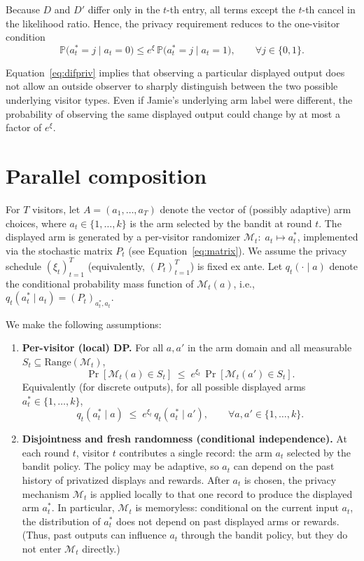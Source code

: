 \documentclass[mksc,nonblindrev]{informs3}
\begin{document}
\begin{APPENDICES}
Because $D$ and $D'$ differ only in the $t$-th entry, all terms except the $t$-th cancel in the likelihood ratio. Hence, the privacy requirement reduces to the one-visitor condition
\begin{equation}\label{eq:difpriv}
\mathbb{P}\big(a_t^*=j \mid a_t=0\big)
\le e^{\xi}\,
\mathbb{P}\big(a_t^*=j \mid a_t=1\big),
\qquad \forall j\in\{0,1\}.
\end{equation}

Equation~\eqref{eq:difpriv} implies that observing a particular displayed output does not allow an outside observer to sharply distinguish between the two possible underlying visitor types. Even if Jamie's underlying arm label were different, the probability of observing the same displayed output could change by at most a factor of $e^{\xi}$.

\section{Parallel composition}\label{app:parallel}
For $T$ visitors, let $A=(a_1,\dots,a_T)$ denote the vector of (possibly adaptive) arm choices, where $a_t \in \{1,\dots,k\}$ is the arm selected by the bandit at round $t$. The displayed arm is generated by a per-visitor randomizer $\mathcal{M}_t:\; a_t \mapsto a_t^*$, implemented via the stochastic matrix $P_t$ (see Equation~\eqref{eq:matrix}). We assume the privacy schedule $(\xi_t)_{t=1}^T$ (equivalently, $(P_t)_{t=1}^T$) is fixed ex ante.  
Let $q_t(\cdot\mid a)$ denote the conditional probability mass function of $\mathcal{M}_t(a)$, i.e.,
$q_t(a_t^*\mid a_t) = (P_t)_{a_t^*,a_t}$.

We make the following assumptions:

\begin{enumerate}
\item[A1.] \textbf{Per-visitor (local) DP.} For all $a,a'$ in the arm domain and all measurable $S_t \subseteq \mathrm{Range}(\mathcal{M}_t)$,
\begin{equation}
\Pr[\mathcal{M}_t(a)\in S_t] \;\le\; e^{\xi_t}\, \Pr[\mathcal{M}_t(a')\in S_t].
\label{eq:dp-t}   
\end{equation}
Equivalently (for discrete outputs), for all possible displayed arms $a_t^*\in\{1,\dots,k\}$,
\[
q_t(a_t^*\mid a) \;\le\; e^{\xi_t}\, q_t(a_t^*\mid a'), 
\qquad \forall a,a'\in\{1,\dots,k\}.
\]

\item[A2.] \textbf{Disjointness and fresh randomness (conditional independence).}
At each round $t$, visitor $t$ contributes a single record: the arm $a_t$ selected by the bandit policy. The policy may be adaptive, so $a_t$ can depend on the past history of privatized displays and rewards. After $a_t$ is chosen, the privacy mechanism $\mathcal{M}_t$ is applied locally to that one record to produce the displayed arm $a_t^*$. In particular, $\mathcal{M}_t$ is memoryless: conditional on the current input $a_t$, the distribution of $a_t^*$ does not depend on past displayed arms or rewards. (Thus, past outputs can influence $a_t$ through the bandit policy, but they do not enter $\mathcal{M}_t$ directly.) 


\end{enumerate}
\end{APPENDICES}
\end{document}
